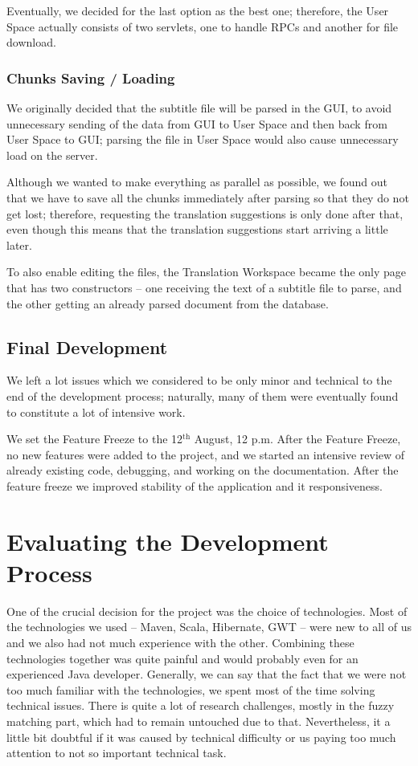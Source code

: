 {Eventually, we decided for the last option as the best one; therefore, the User Space actually consists of two servlets, one to handle RPCs and another for file download.

\subsubsection{Chunks Saving / Loading}

We originally decided that the subtitle file will be parsed in the GUI, 
to avoid unnecessary sending of the data from GUI to User Space and then back from User Space to GUI; parsing the file in User Space would also cause unnecessary load on the server.

Although we wanted to make everything as parallel as possible, we found out that we have to save all the chunks immediately after parsing so that they do not get lost; therefore, requesting the translation suggestions is only done after that, even though this means that the translation suggestions start arriving a little later.

To also enable editing the files, the Translation Workspace became the only page that has two constructors -- one receiving the text of a subtitle file to parse, and the other getting an already parsed document from the database.

\subsection{Final Development}
\label{subsec:final_development}

We left
a lot issues which we considered to be only minor and technical
to the end of the development process;
naturally, many of them were eventually found to constitute a lot of intensive work.

We set the Feature Freeze to the 12$^\mathrm{th}$ August, 12 p.m.
After the Feature Freeze, no new features were added to the project, and 
we started an intensive review of already existing code, debugging, and 
working on the documentation. After the feature freeze we improved 
stability of the application and it responsiveness. 


\section{Evaluating the Development Process}

One of the crucial decision for the project was the choice of technologies. Most of the technologies we used -- Maven, Scala, Hibernate, GWT -- were new to all of us and we also had not much experience with the other. Combining these technologies together was quite painful and would probably even for an experienced Java developer. Generally, we can say that the fact that we were not too much familiar with the technologies, we spent most of the time solving technical issues. There is quite a lot of research challenges, mostly in the fuzzy matching part, which had to remain untouched due to that. Nevertheless, it a little bit doubtful if it was caused by technical difficulty or us paying too much attention to not so important technical task.

}
